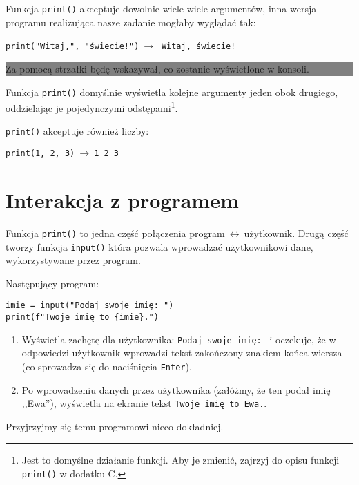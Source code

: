 \documentclass[a4paper]{article}
\newcommand{\important}[1]{
    \begin{center}\colorbox{gray}{
        \begin{minipage}[t]{0.9\textwidth}{#1}
        \end{minipage}
    }
    \end{center}
}
\begin{document}
Funkcja \lstinline|print()| akceptuje dowolnie wiele wiele argumentów, inna wersja programu realizująca nasze zadanie mogłaby wyglądać tak:

\lstinline|print("Witaj,", "świecie!")|$\ \to\ $ \texttt{Witaj, świecie!}

\important{Za pomocą strzałki będę wskazywał, co zostanie wyświetlone w konsoli.}

Funkcja \lstinline|print()| domyślnie wyświetla kolejne argumenty jeden obok drugiego, oddzielając je pojedynczymi odstępami\footnote{Jest to domyślne działanie funkcji. Aby je zmienić, zajrzyj do opisu funkcji \texttt{print()} w dodatku C.}.

\lstinline|print()| akceptuje również liczby:

\lstinline|print(1, 2, 3)|$\ \to\ $\texttt{1 2 3}

\section{Interakcja z programem}

Funkcja \lstinline|print()| to jedna część połączenia \textsf{program}$\ \leftrightarrow\ $\textsf{użytkownik}. Drugą część tworzy funkcja \lstinline|input()| która pozwala wprowadzać użytkownikowi dane, wykorzystywane przez program.

Następujący program:

\begin{lstlisting}
imie = input("Podaj swoje imię: ")
print(f"Twoje imię to {imie}.")
\end{lstlisting}

\begin{enumerate}[label={\arabic*}.]
  \item Wyświetla zachętę dla użytkownika: \texttt{Podaj swoje imię: } i oczekuje, że w odpowiedzi użytkownik wprowadzi tekst zakończony znakiem końca wiersza (co sprowadza się do naciśnięcia \texttt{Enter}).
  \item Po wprowadzeniu danych przez użytkownika (załóżmy, że ten podał imię ,,Ewa''), wyświetla na ekranie tekst \texttt{Twoje imię to Ewa.}.
\end{enumerate}

Przyjrzyjmy się temu programowi nieco dokładniej.
\end{document}
